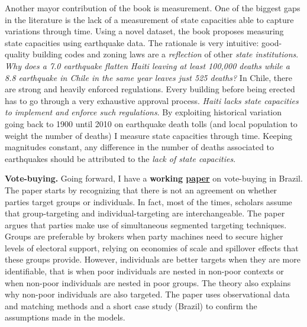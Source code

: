 \documentclass[11pt]{letter} %
\begin{document}
\begin{letter}{}
Another mayor contribution of the book is measurement. One of the biggest gaps in the literature is the lack of a measurement of state capacities able to capture variations through time. Using a novel dataset, the book proposes measuring state capacities using earthquake data. The rationale is very intuitive: good-quality building codes and zoning laws are a \emph{reflection} of other \emph{state institutions}. \emph{Why does a 7.0 earthquake flatten Haiti leaving at least 100,000 deaths while a 8.8 earthquake in Chile in the same year leaves just 525 deaths?} In Chile, there are strong and heavily enforced regulations. Every building before being erected has to go through a very exhaustive approval process. \emph{Haiti lacks state capacities to implement and enforce such regulations}. By exploiting historical variation going back to 1900 until 2010 on earthquake death tolls (and local population to weight the number of deaths) I measure state capacities through time. Keeping magnitudes constant, any difference in the number of deaths associated to earthquakes should be attributed to the \emph{lack of state capacities}. 

{\bf Vote-buying.} Going forward, I have a {\bf working \href{https://github.com/hbahamonde/Clientelism_paper/raw/master/Bahamonde_Clientelism_Paper.pdf}{paper}} on vote-buying in Brazil. The paper starts by recognizing that there is not an agreement on whether parties target groups or individuals. In fact, most of the times, scholars assume that group-targeting and individual-targeting are interchangeable. The paper argues that parties make use of simultaneous segmented targeting techniques. Groups are preferable by brokers when party machines need to secure higher levels of electoral support, relying on economies of scale and spillover effects that these groups provide. However, individuals are better targets when they are more identifiable, that is when poor individuals are nested in non-poor contexts or when non-poor individuals are nested in poor groups. The theory also explains why non-poor individuals are also targeted. The paper uses observational data and matching methods and a short case study (Brazil) to confirm the assumptions made in the models.


\end{letter}
\end{document}
